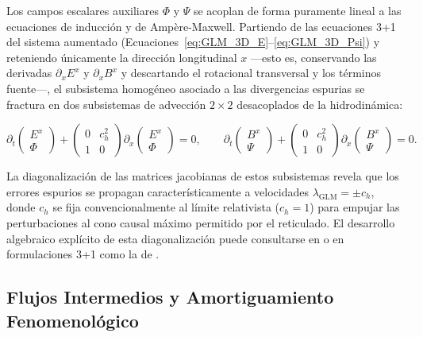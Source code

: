 \primerparrafo Los campos escalares auxiliares $\Phi$ y $\Psi$ se acoplan de forma puramente lineal a las ecuaciones de inducción y de Ampère-Maxwell. Partiendo de las ecuaciones 3+1 del sistema aumentado (Ecuaciones~\eqref{eq:GLM_3D_E}--\eqref{eq:GLM_3D_Psi}) y reteniendo únicamente la dirección longitudinal $x$ ---esto es, conservando las derivadas $\partial_x E^x$ y $\partial_x B^x$ y descartando el rotacional transversal y los términos fuente---, el subsistema homogéneo asociado a las divergencias espurias se fractura en dos subsistemas de advección $2 \times 2$ desacoplados de la hidrodinámica:

\begin{equation}
    \partial_t \begin{pmatrix} E^x \\ \Phi \end{pmatrix} + \begin{pmatrix} 0 & c_h^2 \\ 1 & 0 \end{pmatrix} \partial_x \begin{pmatrix} E^x \\ \Phi \end{pmatrix} = 0, \qquad
    \partial_t \begin{pmatrix} B^x \\ \Psi \end{pmatrix} + \begin{pmatrix} 0 & c_h^2 \\ 1 & 0 \end{pmatrix} \partial_x \begin{pmatrix} B^x \\ \Psi \end{pmatrix} = 0.
\end{equation}

La diagonalización de las matrices jacobianas de estos subsistemas revela que los errores espurios se propagan característicamente a velocidades $\lambda_{\text{GLM}} = \pm c_h$, donde $c_h$ se fija convencionalmente al límite relativista ($c_h = 1$) para empujar las perturbaciones al cono causal máximo permitido por el reticulado. El desarrollo algebraico explícito de esta diagonalización puede consultarse en \textcite{Dedner_etal:2002} o en formulaciones 3+1 como la de \textcite{palenzuela-2009}.

\subsection{Flujos Intermedios y Amortiguamiento Fenomenológico}

